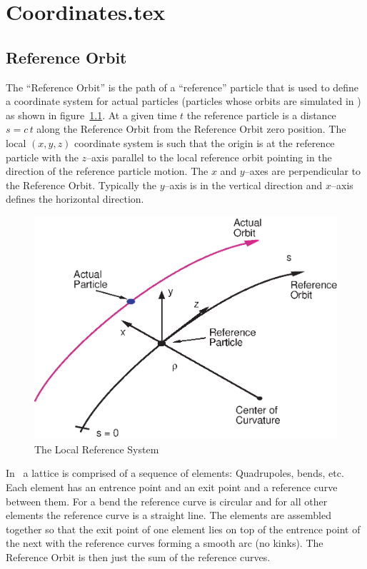 \chapter{Coordinates.tex}

\section{Reference Orbit}

The ``Reference Orbit'' is the path of a ``reference'' particle that
is used to define a coordinate system for actual particles (particles
whose orbits are simulated in \bmad) as shown in
figure~\ref{f:local_coords}. At a given time $t$ the reference particle is
a distance $s = c \, t$ along the Reference Orbit from the Reference
Orbit zero position. The local $(x, y, z)$ coordinate system is such
that the origin is at the reference particle with the $z$--axis
parallel to the local reference orbit pointing in the direction of the
reference particle motion. The $x$ and $y$--axes are perpendicular to
the Reference Orbit. Typically the $y$--axis is in the vertical
direction and $x$--axis defines the horizontal direction.

\begin{figure}[tb]
\centering
\includegraphics{local_coords.ps}
\caption{The Local Reference System}
\label{f:local_coords}
\end{figure}

In \bmad\ a lattice is comprised of a sequence of elements: Quadrupoles,
bends, etc. Each element has an entrence point and an exit point and a
reference curve between them. For a bend the reference curve is
circular and for all other elements the reference curve is a straight
line. The elements are assembled together so that the exit point of
one element lies on top of the entrence point of the next with the
reference curves forming a smooth arc (no kinks). The Reference Orbit
is then just the sum of the reference curves. 

